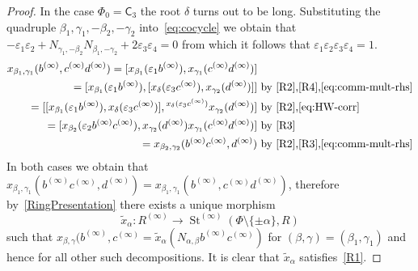 \documentclass{article}
\numberwithin{equation}{section}
\theoremstyle{definition}
\theoremstyle{remark}
\DeclareMathOperator\St{St}
\newcommand{\rC}{\mathsf{C}}
\begin{document}
\begin{proof}
 In the case \(\Phi_0 = \rC_3\) the root $\delta$ turns out to be long.
Substituting the quadruple $\beta_1, \gamma_1, -\beta_2, -\gamma_2$ into~\eqref{eq:cocycle} we obtain that
 $-\varepsilon_1 \varepsilon_2 +  N_{\gamma_1,-\beta_2} N_{\beta_1,-\gamma_2} + 2 \varepsilon_3 \varepsilon_4 = 0$ from which it follows that 
 $\varepsilon_1 \varepsilon_2 \varepsilon_3 \varepsilon_4 = 1$.
 \begin{align*}
 x_{\beta_1, \gamma_1}(b^{(\infty)}, c^{(\infty)} d^{(\infty)}) = [x_{\beta_1}(\varepsilon_1b^{(\infty)}), x_{\gamma_1}(c^{(\infty)} d^{(\infty)})] & \\
 = [x_{\beta_1}(\varepsilon_1b^{(\infty)}), [x_{\delta}(\varepsilon_3c^{(\infty)}), x_{\gamma_2}(d^{(\infty)})]] &\text{ by~\eqref{R2},\eqref{R4},\eqref{eq:comm-mult-rhs}}\\
 = [[x_{\beta_1}(\varepsilon_1b^{(\infty)}), x_\delta(\varepsilon_3c^{(\infty)})], {}^{x_\delta(\varepsilon_3c^{(\infty)})}x_{\gamma_2}(d^{(\infty)})] &\text{ by~\eqref{R2},\eqref{eq:HW-corr}}\\
 = [x_{\beta_2}(\varepsilon_2 b^{(\infty)} c^{(\infty)}), x_{\gamma_2}(d^{(\infty)})x_{\gamma_1}(c^{(\infty)}d^{(\infty)}) ] &\text{ by~\eqref{R3}}\\
 = x_{\beta_2, \gamma_2}(b^{(\infty)} c^{(\infty)}, d^{(\infty)})&\text{ by~\eqref{R2},\eqref{R3},\eqref{eq:comm-mult-rhs}}
 \end{align*}
 In both cases we obtain that \(x_{\beta_1, \gamma_1}(b^{(\infty)} c^{(\infty)}, d^{(\infty)}) = x_{\beta_1, \gamma_1}(b^{(\infty)}, c^{(\infty)} d^{(\infty)})\),
  therefore by~\cref{RingPresentation} there exists a unique morphism \[\widetilde x_\alpha \colon R^{(\infty)} \to \St^{(\infty)}(\Phi \setminus\{\pm \alpha\}, R)\] such that
  \(x_{\beta, \gamma}(b^{(\infty)}, c^{(\infty)} = \widetilde x_\alpha(N_{\alpha, \beta} b^{(\infty)} c^{(\infty)})\) for \((\beta, \gamma) = (\beta_1, \gamma_1)\) 
  and hence for all other such decompositions. 
  It is clear that \(\widetilde x_\alpha\) satisfies~\eqref{R1}.
\end{proof}
\end{document}
